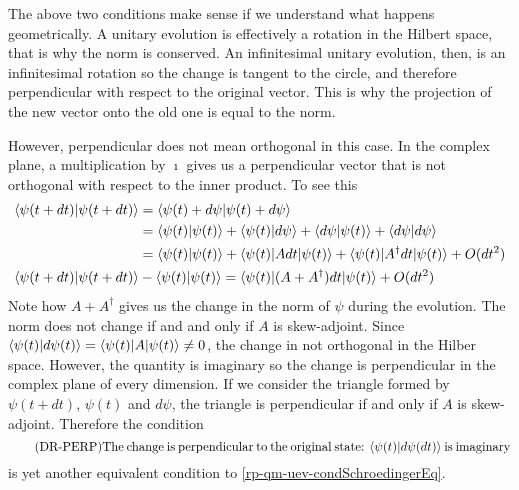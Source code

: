 The above two conditions make sense if we understand what happens geometrically. A unitary evolution is effectively a rotation in the Hilbert space, that is why the norm is conserved. An infinitesimal unitary evolution, then, is an infinitesimal rotation so the change is tangent to the circle, and therefore perpendicular with respect to the original vector. This is why the projection of the new vector onto the old one is equal to the norm.

However, perpendicular does not mean orthogonal in this case. In the complex plane, a multiplication by $\imath$ gives us a perpendicular vector that is not orthogonal with respect to the inner product. To see this
\begin{equation}
	\begin{aligned}
		\langle\psi(t+dt) | \psi(t+dt) \rangle &= \langle\psi(t) + d\psi | \psi(t) + d\psi \rangle \\
		&= \langle\psi(t) | \psi(t) \rangle + \langle\psi(t) |  d\psi \rangle + \langle d\psi | \psi(t) \rangle + \langle d\psi |  d\psi \rangle \\
		&= \langle\psi(t) | \psi(t) \rangle + \langle\psi(t) | A dt |  \psi(t) \rangle + \langle \psi(t) | A^{\dagger} dt | \psi(t) \rangle + O(dt^2) \\
		\langle\psi(t+dt) | \psi(t+dt) \rangle &- \langle\psi(t) | \psi(t) \rangle = \langle\psi(t) | (A + A^{\dagger})dt | \psi(t) \rangle + O(dt^2)
	\end{aligned}
\end{equation}
Note how $A + A^{\dagger}$ gives us the change in the norm of $\psi$ during the evolution. The norm does not change if and and only if $A$ is skew-adjoint. Since $\langle\psi(t) |  d\psi(t) \rangle = \langle\psi(t) | A | \psi(t) \rangle \neq 0$, the change in not orthogonal in the Hilber space. However, the quantity is imaginary so the change is perpendicular in the complex plane of every dimension. If we consider the triangle formed by $\psi(t+dt)$, $\psi(t)$ and $d\psi$, the triangle is perpendicular if and only if $A$ is skew-adjoint. Therefore the condition
\begin{equation}\label{rp-qm-uev-condOrthogonalChange}
	\tag{DR-PERP}
	\eqtext{The change is perpendicular to the original state: $\< \psi(t) | d\psi(dt) \>$ is imaginary} 
\end{equation}
is yet another equivalent condition to \ref{rp-qm-uev-condSchroedingerEq}.

